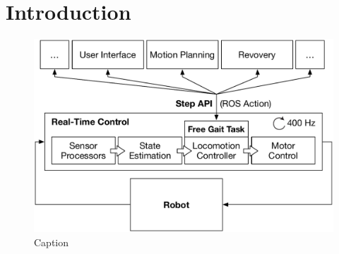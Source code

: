 \section{Introduction}

\begin{figure}
	\centering
	\includegraphics[width=0.65 \textwidth]{images/control_scheme} 
	\caption{Caption}
	\label{fig:control_scheme}
\end{figure}